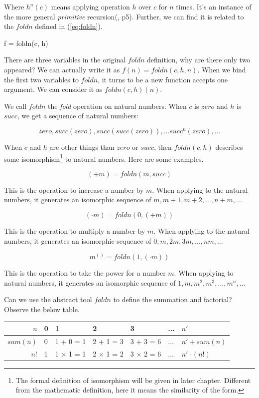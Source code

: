 \documentclass[b5paper]{article}
\begin{document}
\vspace{5mm}

Where $h^n(c)$ means applying operation $h$ over $c$ for $n$ times. It's an instance of the more general {\em primitive} recursion(\cite{Bird97}, p5). Further, we can find it is related to the $foldn$ defined in (\ref{eq:foldn}).

\be
f = foldn(c, h)
\ee

There are three variables in the original $foldn$ definition, why are there only two appeared? We can actually write it as $f(n) = foldn(c, h, n)$. When we bind the first two variables to $foldn$, it turns to be a new function accepts one argument. We can consider it as $foldn(c, h)(n)$.

We call $foldn$ the {\em fold} operation on natural numbers. When $c$ is $zero$ and $h$ is $succ$, we get a sequence of natural numbers:

\[
zero, succ(zero), succ(succ(zero)), ... succ^n(zero), ...
\]

When $c$ and $h$ are other things than $zero$ or $succ$, then $foldn(c, h)$ describes some isomorphism\footnote{The formal definition of isomorphism will be given in later chapter. Different from the mathematic definition, here it means the similarity of the form.} to natural numbers. Here are some examples.

\[
(+ m) = foldn(m, succ)
\]

This is the operation to increase a number by $m$. When applying to the natural numbers, it generates an isomorphic sequence of $m, m + 1, m + 2, ..., n + m, ...$

\[
(\cdot m) = foldn(0, (+ m))
\]

This is the operation to multiply a number by $m$. When applying to the natural numbers, it generates an isomorphic sequence of $0, m, 2m, 3m, ..., nm, ...$

\[
m^{()} = foldn(1, (\cdot m))
\]

This is the operation to take the power for a number $m$. When applying to natural numbers, it generates an isomorphic sequence of $1, m, m^2, m^3, ..., m^n, ...$

Can we use the abstract tool $foldn$ to define the summation and factorial? Observe the below table.

\vspace{5mm}

\begin{tabular}{r|l|l|l|l|l|l}
$n$ & 0 & 1 & 2 & 3 & ... & $n'$ \\
\hline
$sum(n)$ & 0 & 1 + 0 = 1 & 2 + 1 = 3 & 3 + 3 = 6 & ... & $n' + sum(n)$ \\
\hline
$n!$ & 1 & 1 $\times$ 1 = 1 & 2 $\times$ 1 = 2 & 3 $\times$ 2 = 6 & ... & $n' \cdot (n!)$
\end{tabular}
\end{document}
